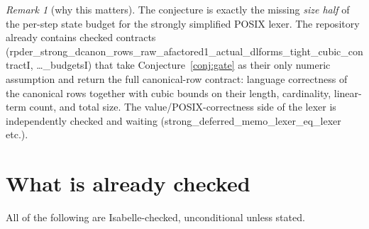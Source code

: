 \documentclass[11pt]{article}
\theoremstyle{remark}
\newtheorem{remark}{Remark}
\newcommand{\thy}[1]{\textsf{\small #1}}
\begin{document}
\begin{remark}[why this matters]
The conjecture is exactly the missing \emph{size half} of the per-step state
budget for the strongly simplified POSIX lexer.  The repository already
contains checked contracts
(\thy{rpder\_strong\_dcanon\_rows\_raw\_afactored1\_actual\_dlforms\_tight\_cubic\_contractI},
\thy{\dots\_budgetsI}) that take Conjecture~\ref{conj:gate} as their only
numeric assumption and return the full canonical-row contract: language
correctness of the canonical rows together with cubic bounds on their length,
cardinality, linear-term count, and total size.  The value/POSIX-correctness
side of the lexer is independently checked and waiting
(\thy{strong\_deferred\_memo\_lexer\_eq\_lexer} etc.).
\end{remark}

\section{What is already checked}\label{sec:known}

All of the following are Isabelle-checked, unconditional unless stated.
\end{document}
